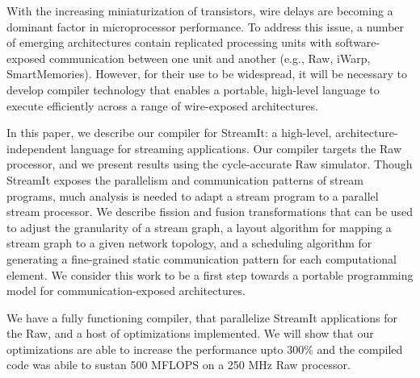 With the increasing miniaturization of transistors, wire delays are
becoming a dominant factor in microprocessor performance.  To address
this issue, a number of emerging architectures contain replicated
processing units with software-exposed communication between one unit
and another (e.g., Raw, iWarp, SmartMemories).  However, for
their use to be widespread, it will be necessary to develop compiler
technology that enables a portable, high-level language to execute
efficiently across a range of wire-exposed architectures.

In this paper, we describe our compiler for StreamIt: a high-level,
architecture-independent language for streaming applications.  Our
compiler targets the Raw processor, and we present results using the
cycle-accurate Raw simulator.  Though StreamIt exposes the parallelism
and communication patterns of stream programs, much analysis is needed
to adapt a stream program to a parallel stream processor.  We describe
fission and fusion transformations that can be used to adjust the
granularity of a stream graph, a layout algorithm for mapping a stream
graph to a given network topology, and a scheduling algorithm for
generating a fine-grained static communication pattern for each
computational element.  We consider this work to be a first step
towards a portable programming model for communication-exposed
architectures.

We have a fully functioning compiler, that parallelize StreamIt
applications for the Raw, and a host of optimizations implemented. We
will show that our optimizations are able to increase the performance
upto 300\% and the compiled code was abile to sustan 500 MFLOPS on a
250 MHz Raw processor.
